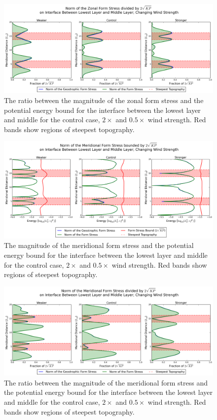 \documentclass[12pt,a4paper]{report}
\begin{document}
\begin{figure}
	\centering
	\includegraphics[width=\linewidth]{uformnormoverbound_0_0}
	\caption{The ratio between the magnitude of the zonal form stress 
		and the potential energy bound for the
		interface between
		the lowest layer and middle for the control case, $2\times$ and $0.5\times$ wind strength.  Red bands show regions of steepest topography. }
	\label{uformnormoverbound00}
\end{figure}

\begin{figure}
	\centering
	\includegraphics[width=\linewidth]{vepebound_0_0}
	\caption{ The magnitude of the meridional form stress and the potential energy bound for the
		interface between
		the lowest layer and middle for the control case, $2\times$ and $0.5\times$ wind strength.  Red bands show regions of steepest topography.}
	\label{vepebound00}
\end{figure}


\begin{figure}
	\centering
	\includegraphics[width=\linewidth]{vformnormoverbound_0_0}
	\caption{The ratio between the magnitude of the meridional form stress 
		and the potential energy bound for the
		interface between
		the lowest layer and middle for the control case, $2\times$ and $0.5\times$ wind strength.  Red bands show regions of steepest topography. }
	\label{vformnormoverbound00}
\end{figure}
\end{document}
